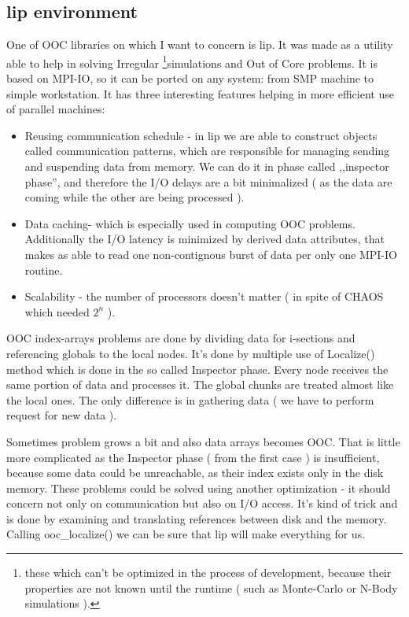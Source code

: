 \subsection{lip environment}
One of OOC libraries on which I want to concern is lip. \cite{kzajac} 
It was made as a utility able to help in solving Irregular \footnote{these which can't be optimized in the process of development, because their properties are not known until the runtime ( such as Monte-Carlo or N-Body simulations ). }simulations and Out of Core problems.
It is based on MPI-IO, so it can be ported on any system: from SMP machine to simple workstation.
It has three interesting features helping in more efficient use of parallel machines:

\begin{itemize}
	\item{Reusing communication schedule} - in lip we are able to construct objects called communication patterns, which are responsible for managing sending and suspending data from memory.
	We can do it in phase called ,,inspector phase'', and therefore the I/O delays are a bit minimalized ( as the data are coming while the other are being processed ).
	\item{Data caching}- which is especially used in computing OOC problems. Additionally the I/O latency is minimized by derived data attributes, that makes as able to read one non-contignous burst of data per only one MPI-IO routine. 
	\item{Scalability} - the number of processors doesn't matter ( in spite of CHAOS which needed $2^n$ ).

\end{itemize}

OOC index-arrays problems are done by dividing data for i-sections and referencing globals to the local nodes.
It's done by multiple use of Localize() method which is done in the so called Inspector phase.
Every node receives the same portion of data and processes it. 
The global chunks are treated almost like the local ones.
The only difference is in gathering data ( we have to perform request for new data ).

Sometimes problem grows a bit and also data arrays becomes OOC.
That is little more complicated as the Inspector phase ( from the first case ) is insufficient, because some data could be unreachable, as their index exists only in the disk memory.
These problems could be solved using another optimization - it should concern not only on communication but also on I/O access. 
It's kind of trick and is done by examining and translating references between disk and the memory.
Calling ooc\_localize() we can be sure that lip will make everything for us.

